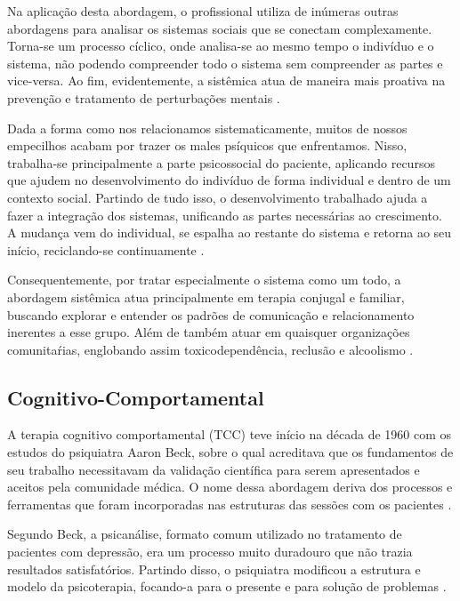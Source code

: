 Na aplicação desta abordagem, o profissional utiliza de inúmeras outras abordagens para analisar os sistemas sociais que se conectam complexamente. Torna-se um processo cíclico, onde analisa-se ao mesmo tempo o indivíduo e o sistema, não podendo compreender todo o sistema sem compreender as partes e vice-versa. Ao fim, evidentemente, a sistêmica atua de maneira mais proativa na prevenção e tratamento de perturbações mentais \cite{Psychotherapy2009}. 

Dada a forma como nos relacionamos sistematicamente, muitos de nossos empecilhos acabam por trazer os males psíquicos que enfrentamos. Nisso, trabalha-se principalmente a parte psicossocial do paciente, aplicando recursos que ajudem no desenvolvimento do indivíduo de forma individual e dentro de um contexto social. Partindo de tudo isso, o desenvolvimento trabalhado ajuda a fazer a integração dos sistemas, unificando as partes necessárias ao crescimento. A mudança vem do individual, se espalha ao restante do sistema e retorna ao seu início, reciclando-se continuamente \cite{Verissimo2020}.

Consequentemente, por tratar especialmente o sistema como um todo, a abordagem sistêmica atua principalmente em terapia conjugal e familiar, buscando explorar e entender os padrões de comunicação e relacionamento inerentes a esse grupo. Além de também atuar em quaisquer organizações comunitaŕias, englobando assim toxicodependência, reclusão e alcoolismo \cite{Psychotherapy2009}.

\subsection{Cognitivo-Comportamental}
\label{sec:cognitivoComportamental}
A terapia cognitivo comportamental (TCC) teve início na década de 1960 com os estudos do psiquiatra Aaron Beck, sobre o qual acreditava que os fundamentos de seu trabalho necessitavam da validação científica para serem apresentados e aceitos pela comunidade médica. O nome dessa abordagem deriva dos processos e ferramentas que foram incorporadas nas estruturas das sessões com os pacientes \cite{Nogueira2018}.

Segundo Beck, a psicanálise, formato comum utilizado no tratamento de pacientes com depressão, era um processo muito duradouro que não trazia resultados satisfatórios. Partindo disso, o psiquiatra modificou a estrutura e modelo da psicoterapia, focando-a para o presente e para solução de problemas \cite{Barros2022}.

